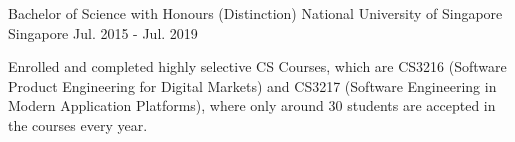 

\begin{cventries}

  \cventry
    {Bachelor of Science with Honours (Distinction)} %
    {National University of Singapore} %
    {Singapore} %
    {Jul. 2015 - Jul. 2019} %
    {
      \begin{cvitems} %
        \item {Enrolled and completed highly selective CS Courses, which are CS3216 (Software Product Engineering for Digital Markets) and CS3217 (Software Engineering in Modern Application Platforms), where only around 30 students are accepted in the courses every year.}
      \end{cvitems}
    }
\end{cventries}
